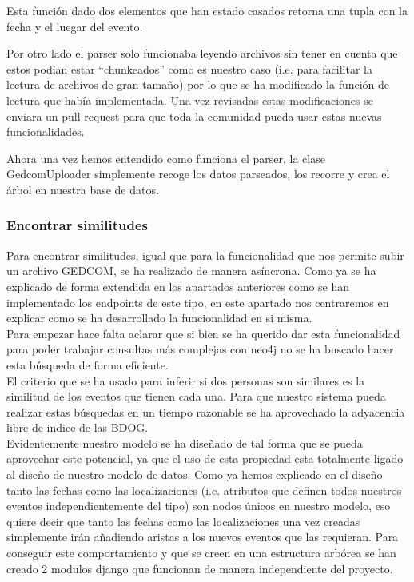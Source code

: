 Esta función dado dos elementos que han estado casados retorna una tupla con la fecha y el luegar del evento.

Por otro lado el parser solo funcionaba leyendo archivos sin tener en cuenta que estos podian estar ``chunkeados'' como es nuestro caso (i.e. para facilitar la lectura de archivos de gran tamaño) por lo que se ha modificado la función de lectura que había implementada. Una vez revisadas estas modificaciones se enviara un pull request para que toda la comunidad pueda usar estas nuevas funcionalidades.

Ahora una vez hemos entendido como funciona el parser, la clase GedcomUploader simplemente recoge los datos parseados, los recorre y crea el árbol en nuestra base de datos. 

\subsubsection{Encontrar similitudes}
Para encontrar similitudes, igual que para la funcionalidad que nos permite subir un archivo GEDCOM, se ha realizado de manera asíncrona. Como ya se ha explicado de forma extendida en los apartados anteriores como se han implementado los endpoints de este tipo, en este apartado nos centraremos en explicar como se ha desarrollado la funcionalidad en si misma.\\
Para empezar hace falta aclarar que si bien se ha querido dar esta funcionalidad para poder trabajar consultas más complejas con neo4j no se ha buscado hacer esta búsqueda de forma eficiente.\\
El criterio que se ha usado para inferir si dos personas son similares es la similitud de los eventos que tienen cada una. Para que nuestro sistema pueda realizar estas búsquedas en un tiempo razonable se ha aprovechado la adyacencia libre de indice de las BDOG.\\
Evidentemente nuestro modelo se ha diseñado de tal forma que se pueda aprovechar este potencial, ya que el uso de esta propiedad esta totalmente ligado al diseño de nuestro modelo de datos. Como ya hemos explicado en el diseño tanto las fechas como las localizaciones (i.e. atributos que definen todos nuestros eventos independientemente del tipo) son nodos únicos en nuestro modelo, eso quiere decir que tanto las fechas como las localizaciones una vez creadas simplemente irán añadiendo aristas a los nuevos eventos que las requieran. Para conseguir este comportamiento y que se creen en una estructura arbórea se han creado 2 modulos django que funcionan de manera independiente del proyecto.

